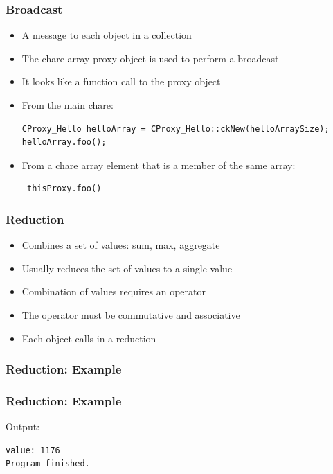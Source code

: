 \begin{frame}[fragile]
  \frametitle{Broadcast}
  \begin{itemize}
    \item A message to each object in a collection
    \item The chare array proxy object is used to perform a broadcast
    \item It looks like a function call to the proxy object
    \item From the main chare:
    \begin{lstlisting}
CProxy_Hello helloArray = CProxy_Hello::ckNew(helloArraySize);
helloArray.foo();
    \end{lstlisting}
    \item From a chare array element that is a member of the same array:
     \begin{lstlisting}
 thisProxy.foo()
    \end{lstlisting}
  \end{itemize}
\end{frame}

\begin{frame}[fragile]
  \frametitle{Reduction}
  \begin{itemize}
  \item Combines a set of values: sum, max, aggregate
  \item Usually reduces the set of values to a single value
  \item Combination of values requires an operator
  \item The operator must be commutative and associative
  \item Each object calls  in a reduction
  \end{itemize}
\end{frame}

\begin{frame}[fragile]
  \frametitle{Reduction: Example}
  
\end{frame}

\begin{frame}[fragile]
  \frametitle{Reduction: Example}
  
Output:
  \begin{lstlisting}[basicstyle=\tiny]
value: 1176
Program finished.
  \end{lstlisting}
\end{frame}

